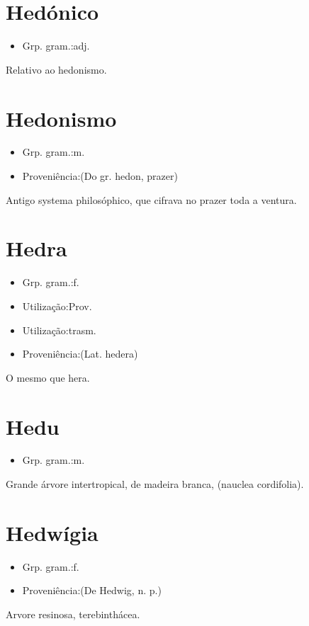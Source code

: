 \documentclass{article}
\begin{document}
\section{Hedónico}
\begin{itemize}
\item {Grp. gram.:adj.}
\end{itemize}
Relativo ao hedonismo.
\section{Hedonismo}
\begin{itemize}
\item {Grp. gram.:m.}
\end{itemize}
\begin{itemize}
\item {Proveniência:(Do gr. \textunderscore hedon\textunderscore , prazer)}
\end{itemize}
Antigo systema philosóphico, que cifrava no prazer toda a ventura.
\section{Hedra}
\begin{itemize}
\item {Grp. gram.:f.}
\end{itemize}
\begin{itemize}
\item {Utilização:Prov.}
\end{itemize}
\begin{itemize}
\item {Utilização:trasm.}
\end{itemize}
\begin{itemize}
\item {Proveniência:(Lat. \textunderscore hedera\textunderscore )}
\end{itemize}
O mesmo que \textunderscore hera\textunderscore .
\section{Hedu}
\begin{itemize}
\item {Grp. gram.:m.}
\end{itemize}
Grande árvore intertropical, de madeira branca, (\textunderscore nauclea cordifolia\textunderscore ).
\section{Hedwígia}
\begin{itemize}
\item {Grp. gram.:f.}
\end{itemize}
\begin{itemize}
\item {Proveniência:(De \textunderscore Hedwig\textunderscore , n. p.)}
\end{itemize}
Arvore resinosa, terebinthácea.
\end{document}
